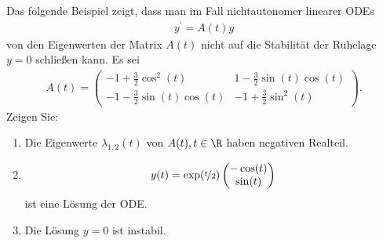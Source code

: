 \begin{exercise}
Das folgende Beispiel zeigt, dass man im Fall nichtautonomer linearer ODEs
\begin{align*}
  y^{\prime} = A(t)y
\end{align*}
von den Eigenwerten der Matrix $A(t)$ nicht auf die Stabilität der Ruhelage $y = 0$
schließen kann. Es sei
\begin{align*}
  A(t) = \begin{pmatrix}
    -1 + \frac{3}{2}\cos^2(t) & 1 -\frac{3}{2}\sin(t)\cos(t) \\
    -1 - \frac{3}{2}\sin(t)\cos(t) & -1 + \frac{3}{2}\sin^2(t)
  \end{pmatrix}.
\end{align*}
Zeigen Sie:
\begin{enumerate}[label = \textbf{\alph*)}]
  \item Die Eigenwerte $\lambda_{1,2}(t)$ von $A(t), t \in \R$ haben negativen Realteil.
  \item
  \begin{align*}
    y(t) = \exp(\nicefrac{t}{2})\begin{pmatrix}
      -\cos(t) \\ \sin(t)
    \end{pmatrix}
  \end{align*}
  ist eine Lösung der ODE.
  \item Die Lösung $y = 0$ ist instabil.
\end{enumerate}
\end{exercise}

